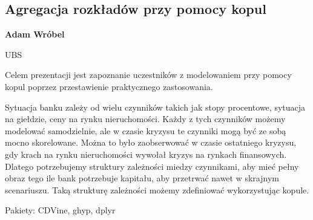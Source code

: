 \documentclass[\main/boa.tex]{subfiles}
\begin{document}
\subsection{Agregacja rozkładów przy pomocy kopul}

\begin{minipage}{0.915\textwidth}
	\centering
  {\bf {} Adam Wróbel}
\end{minipage}

\vskip 0.3cm

\begin{affiliations}
\begin{minipage}{0.915\textwidth}
\centering
UBS \\[-2pt]
\end{minipage}
\end{affiliations}

\vskip 0.8cm
Celem prezentacji jest zapoznanie uczestników z modelowaniem przy pomocy kopul poprzez przestawienie praktycznego zastosowania.

Sytuacja banku zależy od wielu czynników takich jak stopy procentowe, sytuacja na giełdzie, ceny na rynku nieruchomości. Każdy z tych czynników możemy modelować samodzielnie, ale w czasie kryzysu te czynniki mogą być ze sobą mocno skorelowane. Można to było zaobserwować w czasie ostatniego kryzysu, gdy krach na rynku nieruchomości wywołał kryzys na rynkach finansowych. Dlatego potrzebujemy struktury zależności miedzy czynnikami, aby mieć pełny obraz tego ile bank potrzebuje kapitału, aby przetrwać nawet w skrajnym scenariuszu. Taką strukturę zależności możemy zdefiniować wykorzystując kopule.

Pakiety: CDVine, ghyp, dplyr
\end{document}
